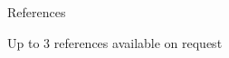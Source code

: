 
\prefix{}
\begin{rubric}{References}

{\large Up to 3 references available on request\par}
\end{rubric}